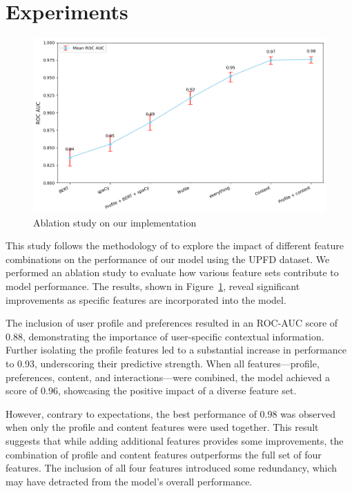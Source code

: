 \documentclass[sigconf,nonacm]{acmart}
\begin{document}
\section{Experiments}
\begin{figure}
    \centering
    \includegraphics[scale=0.35]{roc_results.png}
    \caption{Ablation study on our implementation}
    \label{fig:ablation_results}
\end{figure}

This study follows the methodology of \cite{monti2019fakenewsdetectionsocial} to explore the impact of different feature combinations on the performance of our model using the UPFD dataset. We performed an ablation study to evaluate how various feature sets contribute to model performance. The results, shown in Figure~\ref{fig:ablation_results}, reveal significant improvements as specific features are incorporated into the model.

The inclusion of user profile and preferences resulted in an ROC-AUC score of 0.88, demonstrating the importance of user-specific contextual information. Further isolating the profile features led to a substantial increase in performance to 0.93, underscoring their predictive strength. When all features—profile, preferences, content, and interactions—were combined, the model achieved a score of 0.96, showcasing the positive impact of a diverse feature set.

However, contrary to expectations, the best performance of 0.98 was observed when only the profile and content features were used together. This result suggests that while adding additional features provides some improvements, the combination of profile and content features outperforms the full set of four features. The inclusion of all four features introduced some redundancy, which may have detracted from the model’s overall performance. 
\end{document}
